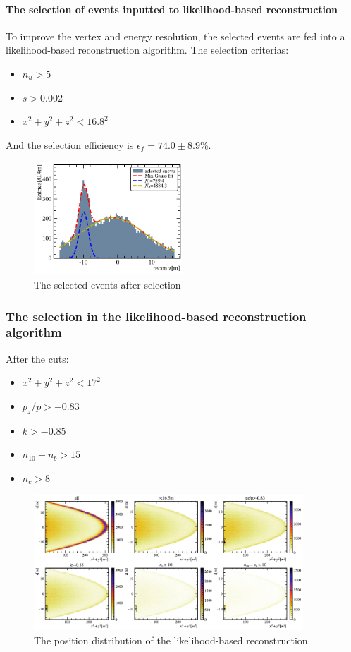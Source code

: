 \paragraph{The selection of events inputted to likelihood-based reconstruction }
To improve the vertex and energy resolution, the selected events are fed into a likelihood-based reconstruction algorithm.
The selection criterias:
\begin{itemize}
	\item $n_u>5$
	\item $s>0.002$
	\item $x^2+y^2+z^2<16.8^2$
\end{itemize}

And the selection efficiency is $\epsilon_f=74.0\pm8.9$\si{\percent}.
\begin{figure}[!htbp]
	\centering
	\includegraphics[width=0.5\textwidth]{neutrontag/fastrecon/z_input.pdf}
	\caption{The selected events after selection}
	\label{fast:input}
\end{figure}

\subsubsection{The selection in the likelihood-based reconstruction algorithm}
After the cuts:
\begin{itemize}
	\item $x^2+y^2+z^2<17^2$
	\item $p_z/p>-0.83$
	\item $k>-0.85$
	\item $n_{10}-n_{b}>15$
	\item $n_c>8$
\end{itemize}
\begin{figure}[!htbp]
	\centering
	\includegraphics[width=0.9\textwidth]{neutrontag/lb/3671.pdf}
	\caption{The position distribution of the likelihood-based reconstruction.}
	\label{lb:pos}
\end{figure}

